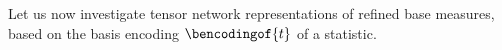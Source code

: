 Let us now investigate tensor network representations of refined base measures, based on the basis encoding $\bencodingof{\sstat}$ of a statistic.

